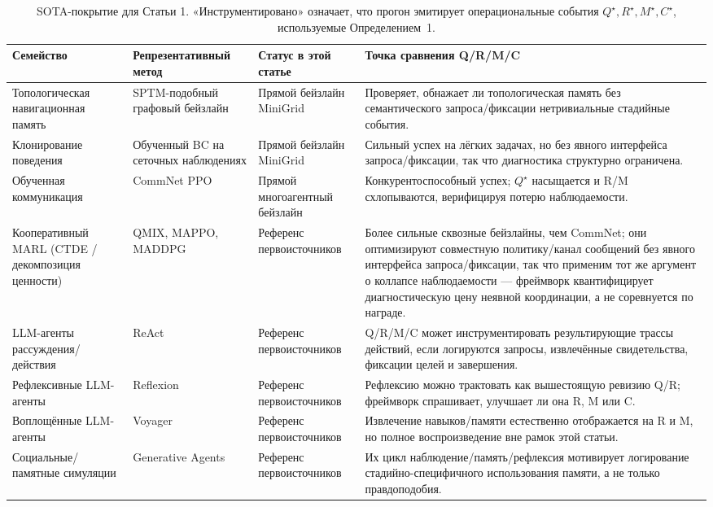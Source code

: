 \documentclass{article}
\begin{document}
\begin{table}[h]
\caption{SOTA-покрытие для Статьи 1. «Инструментировано» означает, что прогон эмитирует операциональные события $Q^\star,R^\star,M^\star,C^\star$, используемые Определением~1.}
\label{tab:sota-coverage}
\centering
\small
\begin{tabular}{p{2.45cm}p{2.55cm}p{2.7cm}p{4.0cm}}
\toprule
Семейство & Репрезентативный метод & Статус в этой статье & Точка сравнения Q/R/M/C \\
\midrule
Топологическая навигационная память & SPTM-подобный графовый бейзлайн \citep{savinov2018semi} & Прямой бейзлайн MiniGrid & Проверяет, обнажает ли топологическая память без семантического запроса/фиксации нетривиальные стадийные события. \\
Клонирование поведения & Обученный BC на сеточных наблюдениях & Прямой бейзлайн MiniGrid & Сильный успех на лёгких задачах, но без явного интерфейса запроса/фиксации, так что диагностика структурно ограничена. \\
Обученная коммуникация & CommNet PPO \citep{sukhbaatar2016commnet,schulman2017proximal} & Прямой многоагентный бейзлайн & Конкурентоспособный успех; $Q^\star$ насыщается и R/M схлопываются, верифицируя потерю наблюдаемости. \\
Кооперативный MARL (CTDE / декомпозиция ценности) & QMIX, MAPPO, MADDPG \citep{rashid2018qmix,yu2022mappo,lowe2017maddpg} & Референс первоисточников & Более сильные сквозные бейзлайны, чем CommNet; они оптимизируют совместную политику/канал сообщений без явного интерфейса запроса/фиксации, так что применим тот же аргумент о коллапсе наблюдаемости --- фреймворк квантифицирует диагностическую цену неявной координации, а не соревнуется по награде. \\
LLM-агенты рассуждения/действия & ReAct \citep{yao2022react} & Референс первоисточников & Q/R/M/C может инструментировать результирующие трассы действий, если логируются запросы, извлечённые свидетельства, фиксации целей и завершения. \\
Рефлексивные LLM-агенты & Reflexion \citep{shinn2023reflexion} & Референс первоисточников & Рефлексию можно трактовать как вышестоящую ревизию Q/R; фреймворк спрашивает, улучшает ли она R, M или C. \\
Воплощённые LLM-агенты & Voyager \citep{wang2023voyager} & Референс первоисточников & Извлечение навыков/памяти естественно отображается на R и M, но полное воспроизведение вне рамок этой статьи. \\
Социальные/памятные симуляции & Generative Agents \citep{park2023generative} & Референс первоисточников & Их цикл наблюдение/память/рефлексия мотивирует логирование стадийно-специфичного использования памяти, а не только правдоподобия. \\

\end{tabular}
\end{table}
\end{document}
